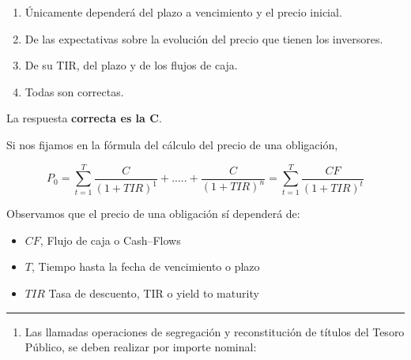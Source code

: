 \documentclass[
  letterpaper,
  DIV=11,
  numbers=noendperiod]{scrreprt}
\providecommand{\tightlist}{%
  \setlength{\itemsep}{0pt}\setlength{\parskip}{0pt}}\usepackage{longtable,booktabs,array}
\begin{document}
\begin{enumerate}
\def\labelenumi{\alph{enumi})}
\item
  Únicamente dependerá del plazo a vencimiento y el precio inicial.
\item
  De las expectativas sobre la evolución del precio que tienen los
  inversores.
\item
  De su TIR, del plazo y de los flujos de caja.
\item
  Todas son correctas.
\end{enumerate}

\begin{tcolorbox}[enhanced jigsaw, left=2mm, opacityback=0, colback=white, breakable, arc=.35mm, bottomrule=.15mm, rightrule=.15mm, toprule=.15mm, leftrule=.75mm, colframe=quarto-callout-tip-color-frame]
\begin{minipage}[t]{5.5mm}
\textcolor{quarto-callout-tip-color}{\faLightbulb}
\end{minipage}%
\begin{minipage}[t]{\textwidth - 5.5mm}

La respuesta \textbf{correcta es la C}.

Si nos fijamos en la fórmula del cálculo del precio de una obligación,

\[P_{ 0 }=\sum _{ t=1 }^{ T }{ \frac { C }{ { (1+TIR) }^{ 1 } }  } +.....+\frac { C }{ { (1+TIR) }^{ n } } =\sum _{ t=1 }^{ T }{ \frac { CF }{ { (1+TIR) }^{ t } }  } \]

Observamos que el precio de una obligación sí dependerá de:

\begin{itemize}
\item
  \(CF\), Flujo de caja o Cash--Flows
\item
  \(T\), Tiempo hasta la fecha de vencimiento o plazo
\item
  \(TIR\) Tasa de descuento, TIR o yield to maturity
\end{itemize}

\end{minipage}%
\end{tcolorbox}

\begin{center}\rule{0.5\linewidth}{0.5pt}\end{center}

\begin{enumerate}
\def\labelenumi{\arabic{enumi}.}
\setcounter{enumi}{66}
\tightlist
\item
  Las llamadas operaciones de segregación y reconstitución de títulos
  del Tesoro Público, se deben realizar por importe nominal:
\end{enumerate}
\end{document}
